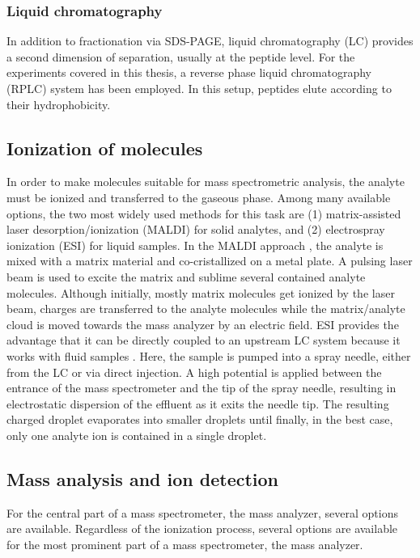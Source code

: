 \subsubsection{Liquid chromatography}

In addition to fractionation via SDS-PAGE, liquid chromatography (LC) provides 
a second dimension of separation, usually at the peptide level.
For the experiments covered in this thesis, a reverse phase liquid 
chromatography (RPLC) system has been employed.
In this setup, peptides elute according to their hydrophobicity.

\subsection{Ionization of molecules}

In order to make molecules suitable for mass spectrometric analysis, 
the analyte must be ionized and transferred to the gaseous phase.
Among many available options, the two most widely used methods for this 
task are (1) matrix-assisted laser desorption/ionization (MALDI) for solid 
analytes, and (2) electrospray ionization (ESI) for liquid samples.
In the MALDI approach \citep{Karas1988}, the analyte is mixed with a 
matrix material and co-cristallized on a metal plate. 
A pulsing laser beam is used to excite the matrix and sublime several 
contained analyte molecules. 
Although initially, mostly matrix molecules get ionized by the laser
beam, charges are transferred to the analyte molecules while the
matrix/analyte cloud is moved towards the mass analyzer by an
electric field.
ESI provides the advantage that it can be directly coupled to an
upstream LC system because it works with fluid samples \citep{Fenn1989}.
Here, the sample is pumped into a spray needle, either from the LC or via
direct injection. 
A high potential is applied between the entrance of the mass spectrometer and
the tip of the spray needle, resulting in electrostatic dispersion of the
effluent as it exits the needle tip.
The resulting charged droplet evaporates into smaller droplets until finally,
in the best case, only one analyte ion is contained in a single droplet.

\subsection{Mass analysis and ion detection}

For the central part of a mass spectrometer, the mass analyzer, several
options are available.
Regardless of the ionization process, several options are available for
the most prominent part of a mass spectrometer, the mass analyzer.

